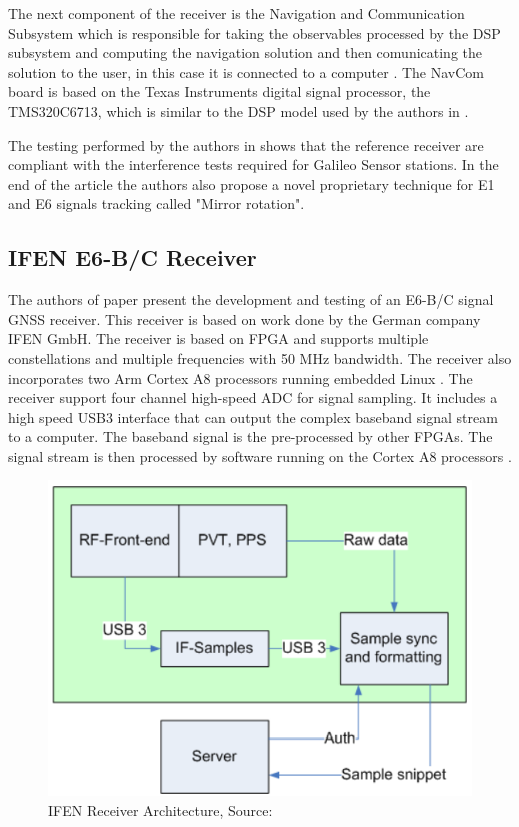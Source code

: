 The next component of the receiver is the Navigation and Communication Subsystem which is responsible for taking the observables processed by the DSP subsystem and computing the navigation solution and then comunicating the solution to the user, in this case it is connected to a computer \cite{refstationreceiver}. The NavCom board is based on the Texas Instruments digital signal processor, the TMS320C6713, which is similar to the DSP model used by the authors in \cite{dspreceiver}.

The testing performed by the authors in \cite{refstationreceiver} shows that the reference receiver are compliant with the interference tests required for Galileo Sensor stations. In the end of the article the authors also propose a novel proprietary technique for E1 and E6 signals tracking called "Mirror rotation"\cite{refstationreceiver}. 

\subsection{IFEN E6-B/C Receiver\cite{e6breceiver}}
\label{subsec:e6brecv}
The authors of paper \cite{e6breceiver} present the development and testing of an E6-B/C signal GNSS receiver. This receiver is based on work done by the German company IFEN GmbH. The receiver is based on FPGA and supports multiple constellations and multiple frequencies with 50 MHz bandwidth. The receiver also incorporates two Arm Cortex A8 processors running embedded Linux \cite{e6breceiver}. The receiver support four channel high-speed ADC for signal sampling. It includes a high speed USB3 interface that can output the complex baseband signal stream to a computer. The baseband signal is the pre-processed by other FPGAs. The signal stream is then processed by software running on the Cortex A8 processors \cite{e6breceiver}.

\begin{figure}[h]
\centering
\includegraphics[scale=0.7]{img/e6barchitecture.png}
\caption{IFEN Receiver Architecture, Source:\cite{e6breceiver}}
\label{fig:e6barchitecture}
\end{figure}

